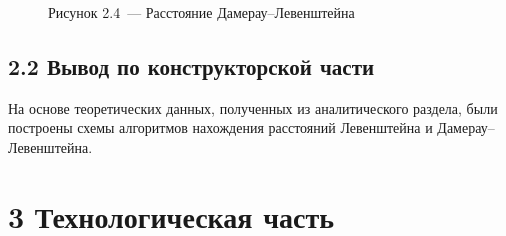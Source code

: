 \documentclass[12pt, a4paper]{report}
\begin{document}
\begin{figure}[H]
\caption*{Рисунок 2.4~--- Расстояние Дамерау--Левенштейна}
\end{figure}

\section*{2.2 Вывод по конструкторской части}

На основе теоретических данных, полученных из аналитического раздела, были построены схемы алгоритмов нахождения расстояний Левенштейна и Дамерау--Левенштейна.

\chapter*{3 Технологическая часть}
\end{document}
